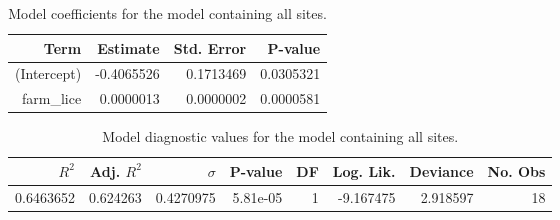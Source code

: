 \begin{table}
\centering
\caption{Model coefficients for the model containing all sites.}
\centering
\begin{tabular}[t]{rrrr}
\toprule
Term & Estimate & Std. Error & P-value\\
\midrule
(Intercept) & -0.4065526 & 0.1713469 & 0.0305321\\
farm\_lice & 0.0000013 & 0.0000002 & 0.0000581\\
\bottomrule
\end{tabular}
\end{table}

\begin{table}
\centering
\caption{Model diagnostic values for the model containing all sites.}
\centering
\begin{tabular}[t]{rrrrrrrr}
\toprule
$R^2$ & Adj. $R^2$ & $\sigma$ & P-value & DF & Log. Lik. & Deviance & No. Obs\\
\midrule
0.6463652 & 0.624263 & 0.4270975 & 5.81e-05 & 1 & -9.167475 & 2.918597 & 18\\
\bottomrule
\end{tabular}
\end{table}
